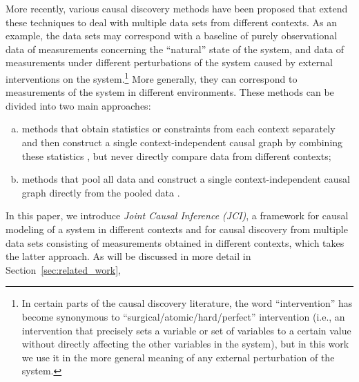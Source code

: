 \documentclass[twoside,11pt]{article}
\begin{document}
More recently, various causal discovery methods have been proposed that extend these techniques 
to deal with multiple data sets from different contexts.
As an example, the data sets may correspond with a baseline 
of purely observational data of measurements concerning the ``natural'' state of the 
system, and data of measurements under different perturbations of the system caused 
by external interventions on the system.\footnote{In
certain parts of the causal discovery literature, the word ``intervention'' has become 
synonymous to ``surgical/atomic/hard/perfect'' intervention (i.e., an intervention that precisely sets a variable or set of variables
to a certain value without directly affecting the other variables in the system), but in this work we use it in the more
general meaning of any external perturbation of the system.} More generally, they can correspond to measurements
of the system in different environments.
These methods can be divided into two main approaches:
\begin{enumerate}[(a)]
\item methods that obtain statistics or constraints from each context separately and then construct a single context-independent causal graph by combining these statistics \citep{Claassen++_NIPS2010,IOD2011,Hyttinen++2012,HEJ2014,triantafillou2015constraint,Rothenhausler++2015,ForreMooij_UAI_18}, but never directly compare data from different contexts;
\item methods that pool all data and construct a single context-independent causal graph directly from the pooled data
\citep{Cooper1997,CooperYoo1999,TianPearl2001,SPP05,EatonMurphy07,Trigger2007,GIES2012,MooijHeskes_UAI_13,ICP2016,oates2016estimating,Zhang++_IJCAI17}.
\end{enumerate}
In this paper, we introduce \emph{Joint Causal Inference (JCI)}, a framework for causal modeling 
of a system in different contexts and for causal discovery from multiple data sets consisting of 
measurements obtained in different contexts, which takes the latter approach. 
As will be discussed in more detail in Section~\ref{sec:related_work}, 
\end{document}
